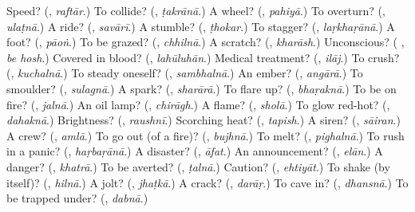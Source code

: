 \begin{tcolorbox}[breakable,colback=teal!4,colframe=teal!35!black,title={Before you move on}]
Speed? (\textbf{}, \emph{raftār}.) To collide? (\textbf{}, \emph{ṭakrānā}.) A wheel? (\textbf{}, \emph{pahiyā}.) To overturn? (\textbf{}, \emph{ulaṭnā}.) A ride? (\textbf{}, \emph{savārī}.) A stumble? (\textbf{}, \emph{ṭhokar}.) To stagger? (\textbf{}, \emph{laṛkhaṛānā}.) A foot? (\textbf{}, \emph{pāoṅ}.) To be grazed? (\textbf{}, \emph{chhilnā}.) A scratch? (\textbf{}, \emph{kharāsh}.) Unconscious? (\textbf{ }, \emph{be hosh}.) Covered in blood? (\textbf{}, \emph{lahūluhān}.) Medical treatment? (\textbf{}, \emph{ilāj}.) To crush? (\textbf{}, \emph{kuchalnā}.) To steady oneself? (\textbf{}, \emph{sambhalnā}.) An ember? (\textbf{}, \emph{angārā}.) To smoulder? (\textbf{}, \emph{sulagnā}.) A spark? (\textbf{}, \emph{sharārā}.) To flare up? (\textbf{}, \emph{bhaṛaknā}.) To be on fire? (\textbf{}, \emph{jalnā}.) An oil lamp? (\textbf{}, \emph{chirāgh}.) A flame? (\textbf{}, \emph{sholā}.) To glow red-hot? (\textbf{}, \emph{dahaknā}.) Brightness? (\textbf{}, \emph{raushnī}.) Scorching heat? (\textbf{}, \emph{tapish}.) A siren? (\textbf{}, \emph{sāiran}.) A crew? (\textbf{}, \emph{amlā}.) To go out (of a fire)? (\textbf{}, \emph{bujhnā}.) To melt? (\textbf{}, \emph{pighalnā}.) To rush in a panic? (\textbf{}, \emph{haṛbaṛānā}.) A disaster? (\textbf{}, \emph{āfat}.) An announcement? (\textbf{}, \emph{elān}.) A danger? (\textbf{}, \emph{khatrā}.) To be averted? (\textbf{}, \emph{ṭalnā}.) Caution? (\textbf{}, \emph{ehtiyāt}.) To shake (by itself)? (\textbf{}, \emph{hilnā}.) A jolt? (\textbf{}, \emph{jhaṭkā}.) A crack? (\textbf{}, \emph{darāṛ}.) To cave in? (\textbf{}, \emph{dhansnā}.) To be trapped under? (\textbf{}, \emph{dabnā}.)
\end{tcolorbox}
